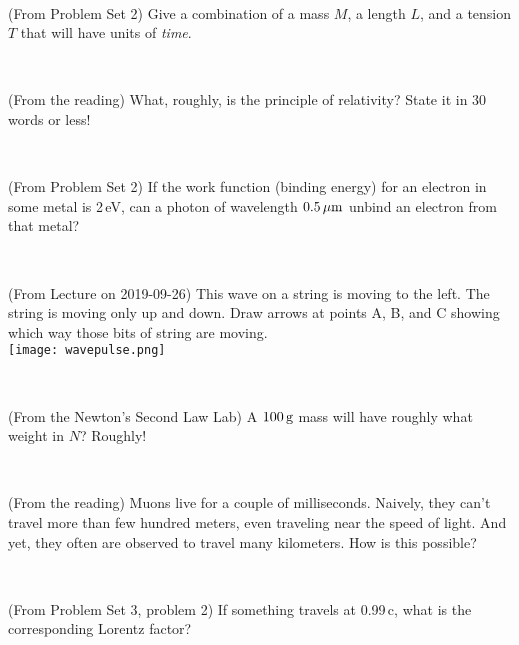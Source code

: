 \documentclass[12pt, letterpaper]{article}
\begin{document}
\vfill ~

\begin{problem}
(From Problem Set 2)
Give a combination of a mass $M$, a length $L$, and a tension $T$ that will have
units of \emph{time}.
\end{problem}

\vfill ~

\begin{problem}
(From the reading)
What, roughly, is the principle of relativity? State it in 30 words or less!
\end{problem}

\vfill ~

\begin{problem}
(From Problem Set 2)
If the work function (binding energy) for an electron in some metal is 2\,eV, can
a photon of wavelength $0.5\,\mu\mathrm{m}$ unbind an electron from that metal?
\end{problem}

\vfill ~

\cleardoublepage

\begin{problem}
(From Lecture on 2019-09-26)
This wave on a string is moving to the left. The string is moving only
up and down. Draw arrows at points A, B, and C showing which way those
bits of string are moving.\\
\texttt{[image: wavepulse.png]}
\end{problem}

\vfill ~

\begin{problem}
(From the Newton's Second Law Lab)
A $100\,\mathrm{g}$ mass will have roughly what weight in $N$? Roughly!
\end{problem}

\vfill ~

\begin{problem}
(From the reading)
Muons live for a couple of milliseconds. Naively, they can't travel more than few hundred meters,
even traveling near the speed of light. And yet, they often are observed to travel many kilometers.
How is this possible?
\end{problem}

\vfill ~

\begin{problem}
(From Problem Set 3, problem 2)
If something travels at 0.99\,c, what is the corresponding Lorentz factor?
\end{problem}

\vfill ~
\end{document}
